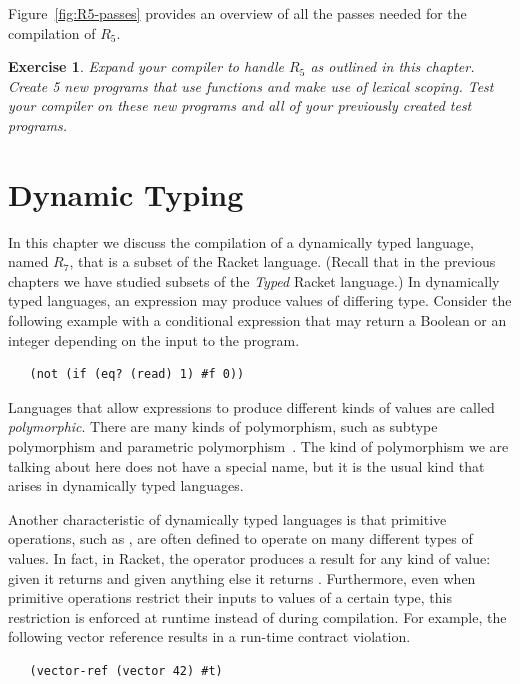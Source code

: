\documentclass[11pt]{book}
\newtheorem{exercise}[theorem]{Exercise}
\begin{document}
Figure~\ref{fig:R5-passes} provides an overview of all the passes needed
for the compilation of $R_5$.

\begin{exercise}\normalfont
Expand your compiler to handle $R_5$ as outlined in this chapter.
Create 5 new programs that use  functions and make use of
lexical scoping. Test your compiler on these new programs and all of
your previously created test programs.
\end{exercise}


\chapter{Dynamic Typing}
\label{ch:type-dynamic}

In this chapter we discuss the compilation of a dynamically typed
language, named $R_7$, that is a subset of the Racket
language. (Recall that in the previous chapters we have studied
subsets of the \emph{Typed} Racket language.) In dynamically typed
languages, an expression may produce values of differing
type. Consider the following example with a conditional expression
that may return a Boolean or an integer depending on the input to the
program.
\begin{lstlisting}
   (not (if (eq? (read) 1) #f 0))
\end{lstlisting}
Languages that allow expressions to produce different kinds of values
are called \emph{polymorphic}. There are many kinds of polymorphism,
such as subtype polymorphism and parametric
polymorphism~\citep{Cardelli:1985kx}. The kind of polymorphism we are
talking about here does not have a special name, but it is the usual
kind that arises in dynamically typed languages.

Another characteristic of dynamically typed languages is that
primitive operations, such as , are often defined to operate
on many different types of values. In fact, in Racket, the 
operator produces a result for any kind of value: given  it
returns  and given anything else it returns .
Furthermore, even when primitive operations restrict their inputs to
values of a certain type, this restriction is enforced at runtime
instead of during compilation. For example, the following vector
reference results in a run-time contract violation.
\begin{lstlisting}
   (vector-ref (vector 42) #t)
\end{lstlisting}
\end{document}
